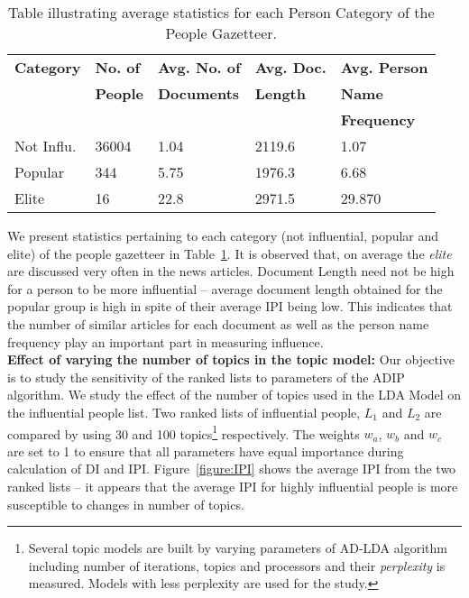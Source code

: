 
\begin{table}[t!]
\resizebox{8cm}{!} {
\centering

    \begin{tabular}{|lllll|}
    \hline
    \textbf{Category}  &  \textbf{No. of }   & \textbf{Avg. No. of }   &  \textbf{Avg. Doc. }	&  \textbf{Avg. Person }	\\  
    & \textbf{People} & \textbf{Documents} & \textbf{Length} &  \textbf{Name } \\
    & & & & \textbf{Frequency} \\  \hline
Not Influ. & 36004 & 1.04 & 2119.6 & 1.07 	\\ \hline
 Popular & 344 & 5.75 & 1976.3 & 6.68  \\ \hline
Elite & 16 & 22.8 & 2971.5 & 29.870	 \\	\hline 
  \end{tabular}}
\caption {Table illustrating average statistics for each Person Category of the People Gazetteer.}
\label{table:stats}  
\end{table}

We present statistics pertaining to each category (not influential, popular and elite) of the people gazetteer in Table~\ref{table:stats}. 
It is observed that, on average the \emph{elite} are discussed very often in the news articles.
Document Length need not be high for a person to be more influential -- average document length obtained for the popular group is high in spite of their average IPI being low. This indicates that the number of similar articles for each document as well as the person name frequency play an important part in measuring influence.\\
\noindent \textbf{Effect of varying the number of topics in the topic model: } Our objective is to study the sensitivity of the ranked lists to parameters of the ADIP algorithm. We study the effect of the number of topics used in the LDA Model on the influential people list.
Two ranked lists of influential people, $L_1$ and $L_2$ are compared by using 30 and 100 topics\footnote{Several topic models are built by varying parameters of AD-LDA algorithm including number of iterations, topics and processors and their \emph{perplexity} is measured. Models with less perplexity are used for the study.} respectively. The weights $w_a$, $w_b$ and $w_c$ are set to 1 to ensure that all parameters have equal importance during calculation of DI and IPI. Figure~\ref{figure:IPI} shows the average IPI from the two ranked lists -- it appears that the average IPI for highly influential people is more susceptible to changes in number of topics.

